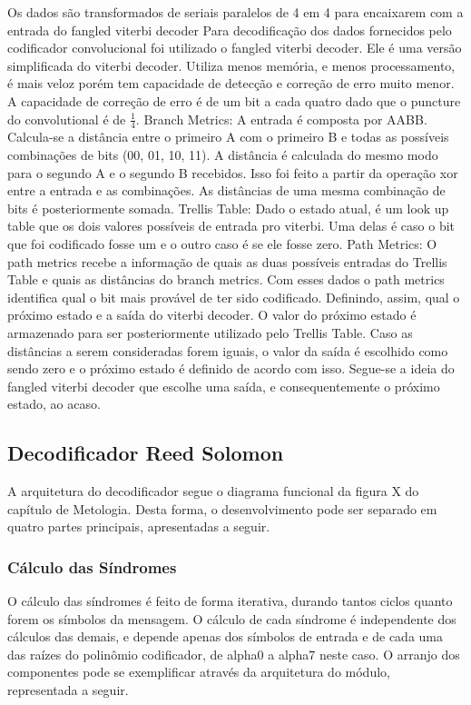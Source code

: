 	Os dados são transformados de seriais paralelos de 4 em 4 para encaixarem com a entrada do fangled viterbi decoder
	Para decodificação dos dados fornecidos pelo codificador convolucional foi utilizado o fangled  viterbi decoder. Ele é uma versão simplificada do viterbi decoder. Utiliza menos memória, e menos processamento, é mais veloz porém tem capacidade de detecção e correção de erro muito menor. A capacidade de correção de erro é de um bit a cada quatro dado que o puncture do convolutional é de $\frac{1}{4}$.
	Branch Metrics: A entrada é composta por AABB. Calcula-se a distância entre o primeiro A com o primeiro B e todas as possíveis combinações de bits (00, 01, 10, 11). A distância é calculada do mesmo modo para o segundo A e o segundo B recebidos. Isso foi feito a partir da operação xor entre a entrada e as combinações. As distâncias de uma mesma combinação de bits é posteriormente somada.
	Trellis Table: Dado o estado atual, é um look up table que os dois valores possíveis de entrada pro viterbi. Uma delas é caso o bit que foi codificado fosse um e o outro caso é se ele fosse zero.
	Path Metrics: O path metrics recebe a informação de quais as duas possíveis entradas do Trellis Table e quais as distâncias do branch metrics. Com esses dados o path metrics identifica qual o bit mais provável de ter sido codificado. Definindo, assim, qual o próximo estado e a saída do viterbi decoder. 
	O valor do próximo estado é armazenado para ser posteriormente utilizado pelo Trellis Table.
	Caso as distâncias a serem consideradas forem iguais, o valor da saída é escolhido como sendo zero e o próximo estado é definido de acordo com isso. Segue-se a ideia do fangled viterbi decoder que escolhe uma saída, e consequentemente o próximo estado, ao acaso. 
	
	
	\subsection{Decodificador Reed Solomon}
	
	A arquitetura do decodificador segue o diagrama funcional da figura X do capítulo de Metologia. Desta forma, o desenvolvimento pode ser separado em quatro partes principais, apresentadas a seguir.
	
	\subsubsection{Cálculo das Síndromes}
	
	O cálculo das síndromes é feito de forma iterativa, durando tantos ciclos quanto forem os símbolos da mensagem. O cálculo de cada síndrome é independente dos cálculos das demais, e depende apenas dos símbolos de entrada e de cada uma das raízes do polinômio codificador, de alpha0 a alpha7 neste caso. O arranjo dos componentes pode se exemplificar através da arquitetura do módulo, representada a seguir.
	
